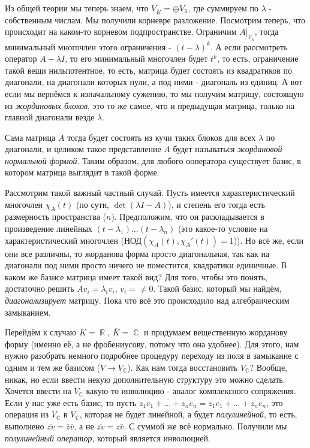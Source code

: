 \documentclass[a4paper,100pt]{article}
\theoremstyle{indented}
\theoremstyle{definition}
\theoremstyle{remark}
\DeclareMathOperator{\CC}{\mathbb{C}}
\DeclareMathOperator{\RR}{\mathbb{R}}
\begin{document}
Из общей теории мы теперь знаем, что $V_{\overline{K}}=\oplus V_\lambda$, где суммируем по $\lambda$ - собственным числам. Мы получили корневре разложение. Посмотрим теперь, что происходит на каком-то корневом подпространстве. Ограничим $A|_{V_\lambda}$, тогда минимальный многочлен этого ограничения - $(t-\lambda)^k$. А если рассмотреть оператор $A-\lambda I$, то его минимальный многочлен будет $t^k$, то есть, ограничение такой вещи нильпотентное, то есть, матрица будет состоять из квадратиков по диагонали, на диагонали которых нули, а под ними - диагональ из единиц. А вот если мы вернёмся к изначальному сужению, то мы получим матрицу, состоящую из \textit{жордановых блоков}, это то же самое, что и предыдущая матрица, только на главной диагонали везде $\lambda$. \ 
 
Сама матрица $A$ тогда будет состоять из кучи таких блоков для всех $\lambda$ по диагонали, и целиком такое представление $A$ будет называться \textit{жордановой нормальной формой}. Таким образом, для любого ооператора существует базис, в котором матрица выглядит в такой форме. \ 

Рассмотрим такой важный частный случай. Пусть имеется характеристический многочлен $\chi_A(t)$ (по сути, $\det(\lambda I - A)$), и степень его тогда есть размерность пространства ($n$). Предположим, что он раскладывается в произведение линейных $(t-\lambda_1)\ldots(t-\lambda_n)$ (это какое-то условие на характеристический многочлен ($\text{НОД}(\chi_A(t), \chi_A'(t))=1$)). Но всё же, если они все различны, то жорданова форма просто диагональная, так как на диагонали под ними просто ничего не поместится, квадратики единичные. В каком же базисе матрица имеет такой вид? Для того, чтобы это понять, достаточно решить $Av_i=\lambda_iv_i$, $v_i=\neq0$. Такой базис, который мы найдём, \textit{диагонализирует} матрицу. Пока что всё это происходило над алгебраическим замыканием. \ 

Перейдём к случаю $K=\RR$, $\overline{K}=\CC$ и придумаем вещественную жорданову форму (именно её, а не фробениусову, потому что она удобнее). Для этого, нам нужно разобрать немного подробнее процедуру переходу из поля в замыкание с одним и тем же базисом ($V\rightarrow V_{\CC}$). Как нам тогда восстановить $V_{\CC}$? Вообще, никак, но если ввести некую дополнительную структуру это можно сделать. Хочется ввести на $V_{\CC}$ какую-то инволюцию - аналог комплексного сопряжения. Если у нас уже есть базис, то пусть $\overline{z_1e_1+\ldots+z_ne_n}=\overline{z_1}e_1+\ldots+\overline{z_n}e_n $, это операция из $V_{\CC}$ в $V_{\CC}$, которая не будет линейной, а будет \textit{полулинейной}, то есть, выполнено $\overline{zv}=\bar{z}\bar{v}$, а не $\overline{zv}=z\bar{v}$. С суммой же всё нормально. Получили мы \textit{полулинейный оператор}, который является инволюцией. \ 
\end{document}
